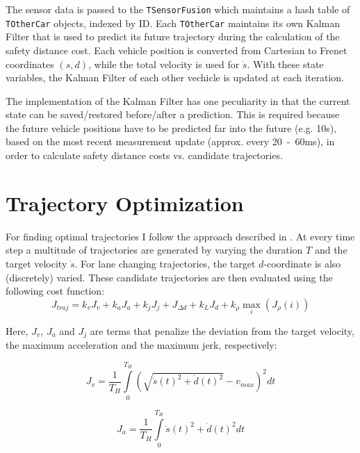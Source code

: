 \documentclass[twoside]{article}
\newcommand{\code}[1]{{\texttt{#1}}}
\begin{document}
The sensor data is passed to the \code{TSensorFusion} which maintains a hash table of
\code{TOtherCar} objects, indexed by ID. Each \code{TOtherCar} maintains its own Kalman Filter that is used to predict its future trajectory during the calculation of the safety distance cost. Each vehicle position is converted from Cartesian to Frenet coordinates $(s,d)$, while the total velocity is used for $\dot s$. With these state variables, the Kalman Filter of each other vechicle is updated at each iteration.

The implementation of the Kalman Filter has one peculiarity in that the current state can
be saved/restored before/after a prediction. This is required because the future vehicle positions have to be predicted far into the future (e.g. 10s), based on the most
recent measurement update (approx. every 20~-~60ms), in order to calculate safety distance
costs vs. candidate trajectories.
\section{Trajectory Optimization}
For finding optimal trajectories I follow the approach described in \cite{werling2010optimal}.
At every time step a multitude of trajectories are generated by varying the duration $T$ and
the target velocity $\dot s$. For lane changing trajectories, the target $d$-coordinate is also
(discretely) varied. These candidate trajectories are then evaluated using the following
cost function:
\begin{equation}
J_{traj} = k_v J_{v} + k_a J_{a} + k_j J_{j} + J_{\Delta d} + k_L J_{d} + k_{\rho} \underset{i}\max(J_{\rho}(i))
\end{equation}

Here, $J_{v}$, $J_{a}$ and $J_{j}$ are terms that penalize the deviation from the target velocity,
the maximum acceleration and the maximum jerk, respectively:

\begin{equation}
J_{v} = \frac{1}{T_H}\int\limits_0^{T_{H}} \left(\sqrt{\dot s(t)^2 + \dot d(t)^2} - v_{max}\right)^2 dt
\end{equation}

\begin{equation}
J_{a} = \frac{1}{T_H}\int\limits_0^{T_{H}}\ddot s(t)^2 + \ddot d(t)^2 dt
\end{equation}
\end{document}
